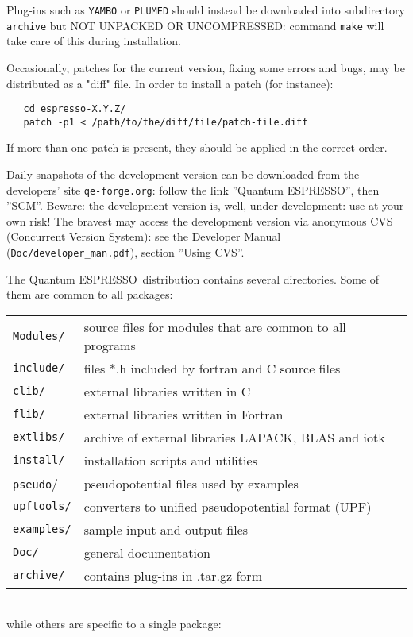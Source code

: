 \documentclass[12pt,a4paper]{article}
\def\qe{{\sc Quantum ESPRESSO}}
\begin{document}
Plug-ins such as \texttt{YAMBO} or \texttt{PLUMED} should instead be downloaded into
subdirectory \texttt{archive} but \uppercase{not unpacked or uncompressed}:
command \texttt{make} will take care of this during installation. 

Occasionally, patches for the current version, fixing some errors and bugs,
may be distributed as a "diff" file. In order to install a patch (for 
instance):
\begin{verbatim}
   cd espresso-X.Y.Z/
   patch -p1 < /path/to/the/diff/file/patch-file.diff
\end{verbatim}
If more than one patch is present, they should be applied in the correct order.

Daily snapshots of the development version can be downloaded from the
developers' site \texttt{qe-forge.org}: follow the link ''Quantum ESPRESSO'', 
then ''SCM''. Beware: the development version 
is, well, under development: use at your own risk! The bravest 
may access the development version via anonymous CVS 
(Concurrent Version System): see the Developer Manual
(\texttt{Doc/developer\_man.pdf}), section ''Using CVS''.

The \qe\ distribution contains several directories. Some of them are
common to all packages:

\begin{tabular}{ll}
\texttt{Modules/} &  source files for modules that are common to all programs\\
\texttt{include/} &  files *.h included by fortran and C source files\\
\texttt{clib/}    &  external libraries written in C\\
\texttt{flib/}    &  external libraries written in Fortran\\
\texttt{extlibs/ }&  archive of external libraries LAPACK, BLAS and iotk\\
\texttt{install/} &  installation scripts and utilities\\
\texttt{pseudo}/  &  pseudopotential files used by examples\\
\texttt{upftools/}&  converters to unified pseudopotential format (UPF)\\
\texttt{examples/}&  sample input and output files\\
\texttt{Doc/}     &  general documentation\\
\texttt{archive/} &  contains plug-ins in .tar.gz form\\
\end{tabular}
\\
while others are specific to a single package:
\end{document}
